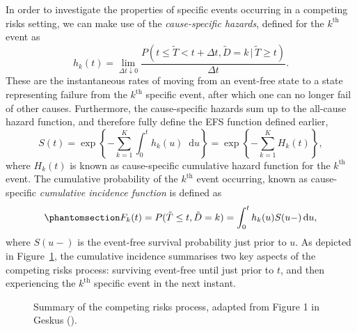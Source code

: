 \documentclass[
  letterpaper,
  paper=240mm:170mm,
  twoside=true,
  open=right,
  fontsize=10pt,
  pagesize=false,
  BCOR=15mm,
  DIV=14,
  headinclude=true,
  footinclude=false,
  headsepline=on]{scrbook}
\newcommand{\given}{\,|\,}
\newcommand\diff{\mathop{}\!\mathrm{d}}
\begin{document}
In order to investigate the properties of specific events occurring in a
competing risks setting, we can make use of the \emph{cause-specific
hazards}, defined for the \(k^{\text{th}}\) event as \[
h_k(t) = \lim_{\Delta t \downarrow 0} \frac{P(t \leq \tilde{T} < t + \Delta t, \tilde{D} = k \given \tilde{T} \geq t)}{\Delta t}.
\] These are the instantaneous rates of moving from an event-free state
to a state representing failure from the \(k^{\text{th}}\) specific
event, after which one can no longer fail of other causes. Furthermore,
the cause-specific hazards sum up to the all-cause hazard function, and
therefore fully define the EFS function defined earlier, \[
S(t) = \exp \left\{ - \sum_{k = 1}^{K} \int_{0}^{t} h_k(u)\diff u \right\} = \exp \left\{ - \sum_{k = 1}^{K} H_k(t) \right\},
\] where \(H_k(t)\) is known as cause-specific cumulative hazard
function for the \(k^{\text{th}}\) event. The cumulative probability of
the \(k^{\text{th}}\) event occurring, known as cause-specific
\emph{cumulative incidence function} is defined as
\begin{equation}\phantomsection\label{eq-cuminc-intro}{
    F_k(t) = P(\tilde{T} \leq t, \tilde{D} = k) = \int_{0}^{t}h_k(u)S(u-)\diff u,
}\end{equation} where \(S(u-)\) is the event-free survival probability
just prior to \(u\). As depicted in Figure~\ref{fig-diag-geskus}, the
cumulative incidence summarises two key aspects of the competing risks
process: surviving event-free until just prior to \(t\), and then
experiencing the \(k^{\text{th}}\) specific event in the next instant.

\begin{figure}


\caption{\label{fig-diag-geskus}Summary of the competing risks process,
adapted from Figure 1 in Geskus
().}

\end{figure}%
\end{document}

